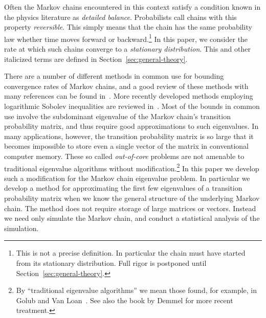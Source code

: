 \documentclass[12pt,letterpaper]{report}
\theoremstyle{plain}
\theoremstyle{definition}
\theoremstyle{remark}
\numberwithin{theorem}{chapter}
\numberwithin{claim}{chapter}
\numberwithin{equation}{chapter}
\numberwithin{conjecture}{chapter}
\newcommand\<{\ensuremath{\langle}}
\renewcommand\>{\ensuremath{\rangle}}
\begin{document}
Often the Markov chains encountered in this context satisfy a condition known in
the physics literature as \emph{detailed balance}. Probabilists call chains with
this property \emph{reversible}. This simply means that the chain has the same
probability law whether time moves forward or backward.\footnote{This is not a
precise definition. In particular the chain must have started from its
stationary distribution. Full rigor is postponed until
Section~\ref{sec:general-theory}.} 
In this paper, we consider the rate at which such chains converge to
a \emph{stationary distribution}. This and other italicized terms are
defined in Section~\ref{sec:general-theory}.

There are a number of different methods in common use for bounding convergence
rates of Markov chains, and a good review of these methods with many references
can be found in~\cite{Rosenthal:1995}.  More recently developed methods
employing logarithmic Sobolev inequalities are reviewed in~\cite{Diaconis:1996}.  
Most of the bounds in common use involve the subdominant eigenvalue of the
Markov chain's transition probability matrix, and thus require good
approximations to such eigenvalues. In many applications, however, the
transition probability matrix is so large that it becomes impossible to store
even a single vector of the matrix in conventional computer memory. These so
called \emph{out-of-core} problems are not amenable to traditional eigenvalue
algorithms without modification.\footnote{By ``traditional 
  eigenvalue algorithms'' we mean those found, for example, in Golub and Van
  Loan~\cite{Golub:1996}. See also the book by Demmel\cite{Demmel:1997} for more 
  recent treatment.}
In this paper we develop such a modification for the Markov chain eigenvalue
problem. In particular we develop a method for approximating the first few
eigenvalues of a transition probability matrix when we know the general
structure of the underlying Markov chain. The method does not require storage
of large matrices or vectors. Instead we need only simulate the Markov chain,
and conduct a statistical analysis of the simulation.
\end{document}
